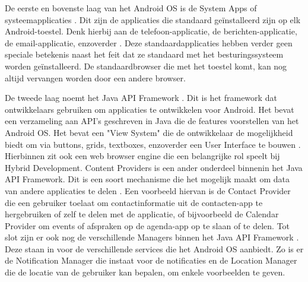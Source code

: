 De eerste en bovenste laag van het Android OS is de System Apps of systeemapplicaties \autocite{Bron7, Bron13}. Dit zijn de applicaties die standaard geïnstalleerd zijn op elk Android-toestel. Denk hierbij aan de telefoon-applicatie, de berichten-applicatie, de email-applicatie, enzoverder \autocite{Bron7}. Deze standaardapplicaties hebben verder geen speciale betekenis naast het feit dat ze standaard met het besturingssysteem worden geïnstalleerd. De standaardbrowser die met het toestel komt, kan nog altijd vervangen worden door een andere browser.

De tweede laag noemt het Java API Framework \autocite{Bron7}. Dit is het framework dat ontwikkelaars gebruiken om applicaties te ontwikkelen voor Android. Het bevat een verzameling aan API's geschreven in Java die de features voorstellen van het Android OS. Het bevat een "View System" die de ontwikkelaar de mogelijkheid biedt om via buttons, grids, textboxes, enzoverder een User Interface te bouwen \autocite{Bron7, Bron13}. Hierbinnen zit ook een web browser engine die een belangrijke rol speelt bij Hybrid Development. Content Providers is een ander onderdeel binnenin het Java API Framework. Dit is een soort mechanisme die het mogelijk maakt om data van andere applicaties te delen \autocite{Bron7}. Een voorbeeld hiervan is de Contact Provider die een gebruiker toelaat om contactinformatie uit de contacten-app te hergebruiken of zelf te delen met de applicatie, of bijvoorbeeld de Calendar Provider om events of afspraken op de agenda-app op te slaan of te delen. Tot slot zijn er ook nog de verschillende Managers binnen het Java API Framework \autocite{Bron7}. Deze staan in voor de verschillende services die het Android OS aanbiedt. Zo is er de Notification Manager die instaat voor de notificaties en de Location Manager die de locatie van de gebruiker kan bepalen, om enkele voorbeelden te geven.


